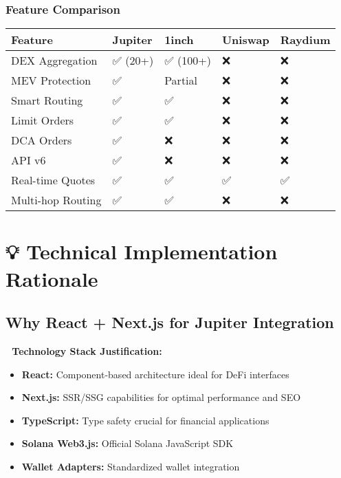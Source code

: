 \documentclass[11pt,a4paper]{article}
\begin{document}
\subsubsection{Feature Comparison}

\begin{longtable}{|p{4cm}|p{2cm}|p{2cm}|p{2cm}|p{2cm}|}
\hline
\textbf{Feature} & \textbf{Jupiter} & \textbf{1inch} & \textbf{Uniswap} & \textbf{Raydium} \\
\hline
\endhead

DEX Aggregation & ✅ (20+) & ✅ (100+) & ❌ & ❌ \\
\hline
MEV Protection & ✅ & Partial & ❌ & ❌ \\
\hline
Smart Routing & ✅ & ✅ & ❌ & ❌ \\
\hline
Limit Orders & ✅ & ✅ & ❌ & ❌ \\
\hline
DCA Orders & ✅ & ❌ & ❌ & ❌ \\
\hline
API v6 & ✅ & ❌ & ❌ & ❌ \\
\hline
Real-time Quotes & ✅ & ✅ & ✅ & ✅ \\
\hline
Multi-hop Routing & ✅ & ✅ & ❌ & ❌ \\
\hline
\end{longtable}

\section{💡 Technical Implementation Rationale}

\subsection{Why React + Next.js for Jupiter Integration}

\begin{tcolorbox}[colback=jupiterBlue!10,colframe=jupiterBlue]
\textbf{🔧 Technology Stack Justification:}
\begin{itemize}
    \item \textbf{React:} Component-based architecture ideal for DeFi interfaces
    \item \textbf{Next.js:} SSR/SSG capabilities for optimal performance and SEO
    \item \textbf{TypeScript:} Type safety crucial for financial applications
    \item \textbf{Solana Web3.js:} Official Solana JavaScript SDK
    \item \textbf{Wallet Adapters:} Standardized wallet integration
\end{itemize}
\end{tcolorbox}
\end{document}

